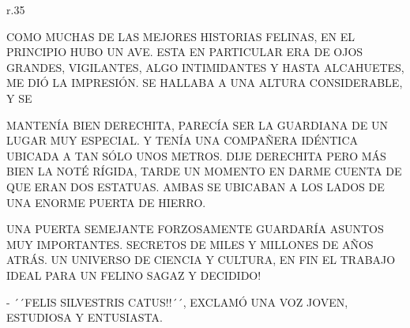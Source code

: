 
\newpage
{}
\begin{wrapfigure}[10]{r}{.35\textwidth}\vspace{-1.85cm}%
\end{wrapfigure}
COMO MUCHAS DE LAS MEJORES HISTORIAS FELINAS, EN EL PRINCIPIO HUBO UN AVE. ESTA EN PARTICULAR ERA DE OJOS GRANDES, VIGILANTES, ALGO INTIMIDANTES Y HASTA ALCAHUETES, ME DIÓ LA IMPRESIÓN. SE HALLABA A UNA ALTURA CONSIDERABLE, Y SE 

MANTENÍA BIEN DERECHITA, PARECÍA SER LA GUARDIANA DE UN LUGAR MUY ESPECIAL. Y TENÍA UNA COMPAÑERA IDÉNTICA UBICADA A TAN SÓLO UNOS METROS. DIJE DERECHITA PERO MÁS BIEN LA NOTÉ RÍGIDA, TARDE UN MOMENTO EN DARME CUENTA DE QUE ERAN DOS ESTATUAS. AMBAS SE UBICABAN A LOS LADOS DE UNA ENORME PUERTA DE HIERRO.

%
\newpage
{}
\begin{minipage}[l]{.45\textwidth}\hspace{-2cm}
\end{minipage}
\begin{minipage}[r]{.45\textwidth}
UNA PUERTA SEMEJANTE FORZOSAMENTE GUARDARÍA ASUNTOS MUY IMPORTANTES. SECRETOS DE MILES Y MILLONES DE AÑOS ATRÁS. UN UNIVERSO DE CIENCIA Y CULTURA, EN FIN EL TRABAJO IDEAL PARA UN FELINO SAGAZ Y DECIDIDO!
\end{minipage}

\newpage
{}
-  ´´FELIS SILVESTRIS CATUS!!´´, EXCLAMÓ UNA VOZ JOVEN, ESTUDIOSA Y ENTUSIASTA.

